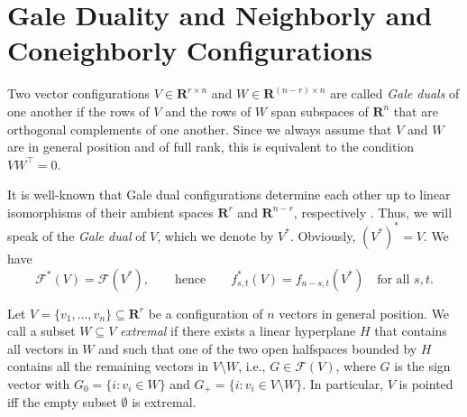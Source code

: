\documentclass[a4paper,USenglish,cleveref, autoref, thm-restate,nolineno]{socg-lipics-v2021}
\newcommand{\R}{\mathbf{R}}
\begin{document}
\section{Gale Duality and Neighborly and Coneighborly Configurations}
\label{sec:Gale}

\begin{definition} 
\label{def:Gale}
Two vector configurations $V \in \R^{r\times n}$ and $W\in \R^{(n-r)\times n}$ are called \emph{Gale duals} of one another if the rows of $V$ and the rows of $W$ span subspaces of $\R^n$ that are orthogonal complements of one another. Since we always assume that $V$ and $W$ are in general position and of full rank, this is equivalent to the condition $VW^{\top} = 0$.
\end{definition}

It is well-known  that 
Gale dual configurations determine each other up to linear isomorphisms of their ambient spaces $\R^r$ and $\R^{n-r}$, respectively \cite[Sec.~5.6]{Matousek:2002aa}. Thus, we will speak of the \emph{Gale dual} of $V$, which we denote by $V^*$. Obviously, $(V^*)^*=V$.
We have 
\[\mathcal{F}^{*}(V)=\mathcal{F}(V^*),\qquad \textrm{hence} \qquad f^*_{s,t}(V)=f_{n-s,t}(V^*)\quad \textrm{for all }s,t.\]


Let $V=\{v_1,\dots,v_n\}\subseteq \R^r$ be a configuration of $n$ vectors in general position. We call a subset $W\subseteq V$ \emph{extremal} if there exists a linear hyperplane $H$ that contains all vectors in $W$ and such that one of the two open halfspaces bounded by $H$ contains all the remaining vectors in $V\setminus W$, i.e., $G\in \mathcal{F}(V)$, where $G$ is the sign vector with $G_0=\{i\colon v_i \in W\}$ and $G_+=\{i\colon v_i \in V\setminus W\}$. In particular, $V$ is pointed iff the empty subset $\emptyset$ is extremal.
\end{document}
